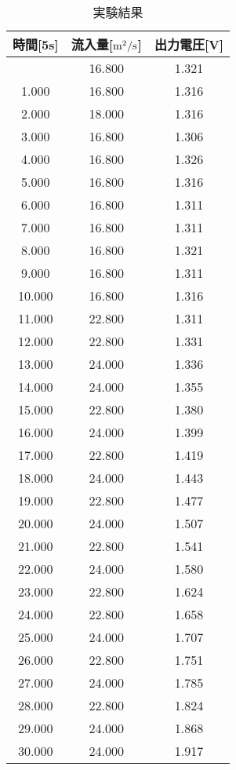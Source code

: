 \begin{longtable}[c]{|c|c|c|}
  \caption{実験結果}
  \label{tab6} \\
  \hline
   時間[5s] & 流入量[${\rm m^2/s}$]&	出力電圧[V]  \\ \hline \hline \endfirsthead 
\hline \endhead
\hline \endfoot
\hline \endlastfoot
0.000	&16.800&1.321  \\ \hline 	
1.000	&16.800&1.316  \\ \hline 	
2.000	&18.000&1.316  \\ \hline 	
3.000	&16.800&1.306  \\ \hline 	
4.000	&16.800&1.326  \\ \hline 	
5.000	&16.800&1.316  \\ \hline 	
6.000	&16.800&1.311  \\ \hline 	
7.000	&16.800&1.311  \\ \hline 	
8.000	&16.800&1.321  \\ \hline 	
9.000	&16.800&1.311  \\ \hline 	
10.000	&16.800&1.316  \\ \hline 	
11.000	&22.800&1.311  \\ \hline 	
12.000	&22.800&1.331  \\ \hline 	
13.000	&24.000&1.336  \\ \hline 	
14.000	&24.000&1.355  \\ \hline 	
15.000	&22.800&1.380  \\ \hline 	
16.000	&24.000&1.399  \\ \hline 	
17.000	&22.800&1.419  \\ \hline 	
18.000	&24.000&1.443  \\ \hline 	
19.000	&22.800&1.477  \\ \hline 	
20.000	&24.000&1.507  \\ \hline 	
21.000	&22.800&1.541  \\ \hline 	
22.000	&24.000&1.580  \\ \hline 	
23.000	&22.800&1.624  \\ \hline 	
24.000	&22.800&1.658  \\ \hline 	
25.000	&24.000&1.707  \\ \hline 	
26.000	&22.800&1.751  \\ \hline 	
27.000	&24.000&1.785  \\ \hline 	
28.000	&22.800&1.824  \\ \hline 	
29.000	&24.000&1.868  \\ \hline 	
30.000	&24.000&1.917  \\ \hline 	

\end{longtable}
